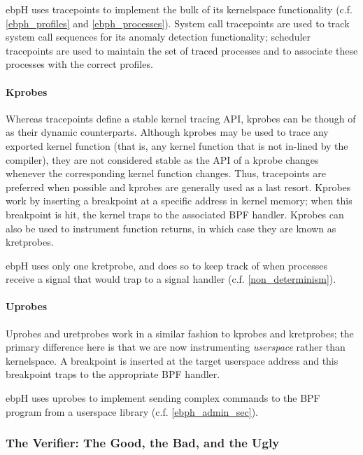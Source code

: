 \documentclass[
  12pt]{findlay}
\begin{document}
ebpH uses tracepoints to implement the bulk of its kernelspace
functionality (c.f. \autoref{ebph_profiles} and
\autoref{ebph_processes}). System call tracepoints are used to track
system call sequences for its anomaly detection functionality; scheduler
tracepoints are used to maintain the set of traced processes and to
associate these processes with the correct profiles.

\hypertarget{kprobes}{%
\paragraph{Kprobes}\label{kprobes}}

Whereas tracepoints define a stable kernel tracing API, kprobes
\autocite{gregg19bpf} can be though of as their dynamic counterparts.
Although kprobes may be used to trace any exported kernel function (that
is, any kernel function that is not in-lined by the compiler), they are
not considered stable as the API of a kprobe changes whenever the
corresponding kernel function changes. Thus, tracepoints are preferred
when possible and kprobes are generally used as a last resort. Kprobes
work by inserting a breakpoint at a specific address in kernel memory;
when this breakpoint is hit, the kernel traps to the associated BPF
handler. Kprobes can also be used to instrument function returns, in
which case they are known as kretprobes.

ebpH uses only one kretprobe, and does so to keep track of when
processes receive a signal that would trap to a signal handler (c.f.
\autoref{non_determinism}).

\hypertarget{uprobes}{%
\paragraph{Uprobes}\label{uprobes}}

Uprobes and uretprobes work in a similar fashion to kprobes and
kretprobes; the primary difference here is that we are now instrumenting
\emph{userspace} rather than kernelspace. A breakpoint is inserted at
the target userspace address and this breakpoint traps to the
appropriate BPF handler.

ebpH uses uprobes to implement sending complex commands to the BPF
program from a userspace library (c.f. \autoref{ebph_admin_sec}).

\hypertarget{the-verifier-the-good-the-bad-and-the-ugly}{%
\subsubsection{The Verifier: The Good, the Bad, and the
Ugly}\label{the-verifier-the-good-the-bad-and-the-ugly}}
\end{document}
